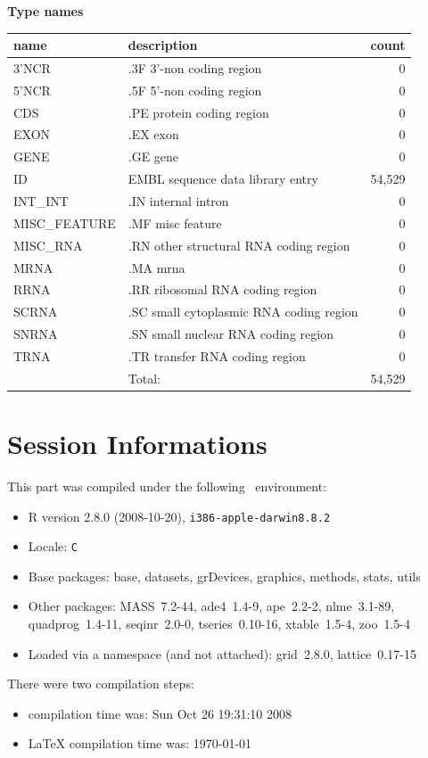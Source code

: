 \documentclass{article}
\begin{document}
\begin{Schunk}
\textbf{Type names}
\noindent\begin{tabular}{llr}
\hline \hline
name & description & count \\
\hline
3'NCR  &  .3F  3'-non coding region  &  0 \\
5'NCR  &  .5F  5'-non coding region  &  0 \\
CDS  &  .PE protein coding region  &  0 \\
EXON  &  .EX exon  &  0 \\
GENE  &  .GE gene  &  0 \\
ID  &  EMBL sequence data library entry  &  54,529 \\
INT\_INT  &  .IN  internal intron  &  0 \\
MISC\_FEATURE  &  .MF misc feature  &  0 \\
MISC\_RNA  &  .RN other structural RNA coding region  &  0 \\
MRNA  &  .MA mrna  &  0 \\
RRNA  &  .RR ribosomal RNA coding region  &  0 \\
SCRNA  &  .SC small cytoplasmic RNA coding region  &  0 \\
SNRNA  &  .SN small nuclear RNA coding region  &  0 \\
TRNA  &  .TR transfer RNA coding region  &  0 \\
\hline
 & Total: & 54,529 \\
\hline \hline
\end{tabular}\end{Schunk}


\section*{Session Informations}

This part was compiled under the following \Rlogo{}~environment:

\begin{itemize}
  \item R version 2.8.0 (2008-10-20), \verb|i386-apple-darwin8.8.2|
  \item Locale: \verb|C|
  \item Base packages: base, datasets, grDevices, graphics, methods,
    stats, utils
  \item Other packages: MASS~7.2-44, ade4~1.4-9, ape~2.2-2,
    nlme~3.1-89, quadprog~1.4-11, seqinr~2.0-0, tseries~0.10-16,
    xtable~1.5-4, zoo~1.5-4
  \item Loaded via a namespace (and not attached): grid~2.8.0,
    lattice~0.17-15
\end{itemize}
There were two compilation steps:

\begin{itemize}
  \item \Rlogo{} compilation time was: Sun Oct 26 19:31:10 2008
  \item \LaTeX{} compilation time was: \today
\end{itemize}


\clearpage
{}


\end{document}
